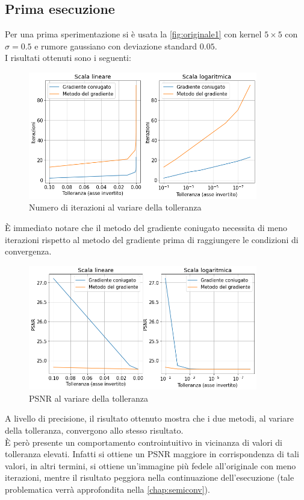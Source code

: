 \documentclass[11pt]{article}
\begin{document}
\subsection{Prima esecuzione}
Per una prima sperimentazione si è usata la \autoref{fig:originale1} con kernel $5 \times 5$ con $\sigma=0.5$ e rumore gaussiano con deviazione standard $0.05$.\\
I risultati ottenuti sono i seguenti:
\begin{figure}[H]
    \centering
    \includegraphics[width=10cm]{iterazioni_cg_gd/1/tol_iter.png}
    \caption{Numero di iterazioni al variare della tolleranza}
    \label{fig:tol_iter1}
\end{figure}
È immediato notare che il metodo del gradiente coniugato necessita di meno iterazioni rispetto al metodo del gradiente prima di raggiungere le condizioni di convergenza.\\

\begin{figure}[H]
    \centering
    \includegraphics[width=10cm]{iterazioni_cg_gd/1/tol_psnr.png}
    \caption{PSNR al variare della tolleranza}
    \label{fig:tol_psnr1}
\end{figure}
A livello di precisione, il risultato ottenuto mostra che i due metodi, al variare della tolleranza, convergono allo stesso risultato.\\
È però presente un comportamento controintuitivo in vicinanza di valori di tolleranza elevati. 
Infatti si ottiene un PSNR maggiore in corrispondenza di tali valori, in altri termini, si ottiene un'immagine più fedele all'originale con meno iterazioni, mentre il risultato peggiora nella continuazione dell'esecuzione (tale problematica verrà approfondita nella \autoref{chap:semiconv}).
\end{document}
